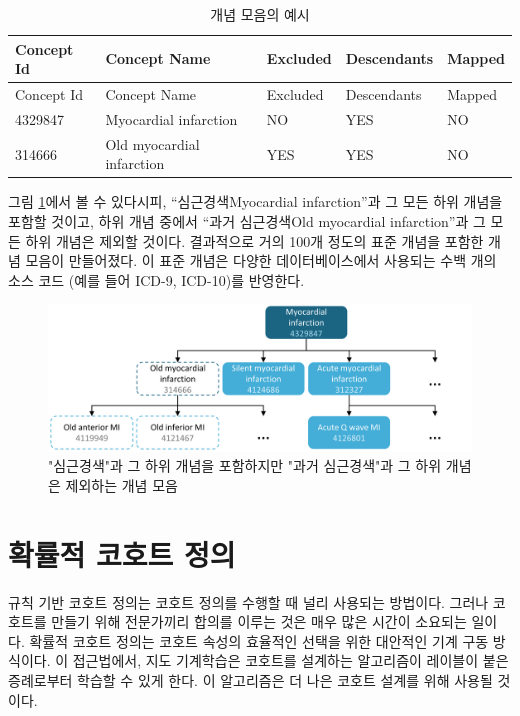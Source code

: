 \documentclass[10.5pt]{book}
\theoremstyle{definition}
\theoremstyle{definition}
\theoremstyle{definition}
\theoremstyle{remark}
\begin{document}
\begin{longtable}[]{@{}lllll@{}}
\caption{\label{tab:conceptSetExpression} 개념 모음의 예시}\tabularnewline
\toprule
Concept Id & Concept Name & Excluded & Descendants &
Mapped\tabularnewline
\midrule
\endfirsthead
\toprule
Concept Id & Concept Name & Excluded & Descendants &
Mapped\tabularnewline
\midrule
\endhead
4329847 & Myocardial infarction & NO & YES & NO\tabularnewline
314666 & Old myocardial infarction & YES & YES & NO\tabularnewline
\bottomrule
\end{longtable}

그림 \ref{fig:conceptSet}에서 볼 수 있다시피, ``심근경색Myocardial
infarction''과 그 모든 하위 개념을 포함할 것이고, 하위 개념 중에서
``과거 심근경색Old myocardial infarction''과 그 모든 하위 개념은 제외할
것이다. 결과적으로 거의 100개 정도의 표준 개념을 포함한 개념 모음이
만들어졌다. 이 표준 개념은 다양한 데이터베이스에서 사용되는 수백 개의
소스 코드 (예를 들어 ICD-9, ICD-10)를 반영한다.

\begin{figure}

{\centering \includegraphics[width=1\linewidth]{images/Cohorts/conceptSet} 

}

\caption{"심근경색"과 그 하위 개념을 포함하지만 "과거 심근경색"과 그 하위 개념은 제외하는 개념 모음}\label{fig:conceptSet}
\end{figure}

\section{확률적 코호트 정의}\label{--}

규칙 기반 코호트 정의는 코호트 정의를 수행할 때 널리 사용되는 방법이다.
그러나 코호트를 만들기 위해 전문가끼리 합의를 이루는 것은 매우 많은
시간이 소요되는 일이다. 확률적 코호트 정의는 코호트 속성의 효율적인
선택을 위한 대안적인 기계 구동 방식이다. 이 접근법에서, 지도 기계학습은
코호트를 설계하는 알고리즘이 레이블이 붙은 증례로부터 학습할 수 있게
한다. 이 알고리즘은 더 나은 코호트 설계를 위해 사용될 것이다.
\end{document}
